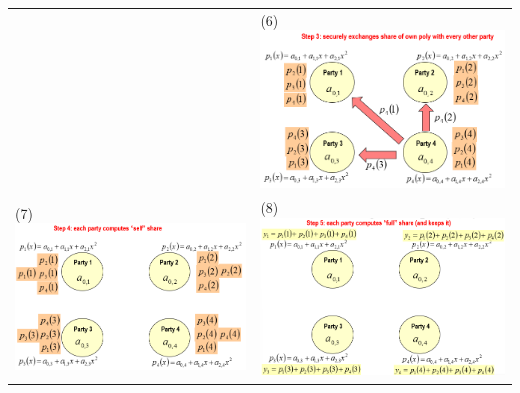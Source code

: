 \documentclass{book}
\begin{document}
\begin{tabularx}{0.99\textwidth}{X X}
     &
    (6)\includegraphics[scale=0.4]{2022-01-02-16-01-46.png}%
    \\
    (7)\includegraphics[scale=0.4]{2022-01-02-16-05-51.png}%
     &
    (8)\includegraphics[scale=0.4]{2022-01-02-16-06-25.png}%

\end{tabularx}
\end{document}
